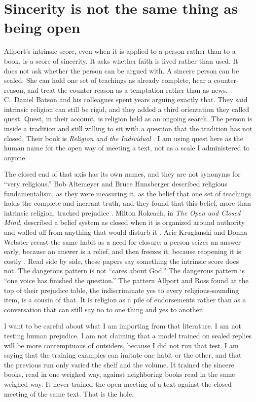 \documentclass[11pt]{article}
\begin{document}
\section{Sincerity is not the same thing as being open}

Allport's intrinsic score, even when it is applied to a person rather than to a book, is a score of sincerity. It asks whether faith is lived rather than used. It does not ask whether the person can be argued with. A sincere person can be sealed. She can hold one set of teachings as already complete, hear a counter-reason, and treat the counter-reason as a temptation rather than as news. C.\ Daniel Batson and his colleagues spent years arguing exactly that. They said intrinsic religion can still be rigid, and they added a third orientation they called quest. Quest, in their account, is religion held as an ongoing search. The person is inside a tradition and still willing to sit with a question that the tradition has not closed. Their book is \emph{Religion and the Individual} \citep{batson1993}. I am using quest here as the human name for the open way of meeting a text, not as a scale I administered to anyone.

The closed end of that axis has its own names, and they are not synonyms for ``very religious.'' Bob Altemeyer and Bruce Hunsberger described religious fundamentalism, as they were measuring it, as the belief that one set of teachings holds the complete and inerrant truth, and they found that this belief, more than intrinsic religion, tracked prejudice \citep{altemeyer1992}. Milton Rokeach, in \emph{The Open and Closed Mind}, described a belief system as closed when it is organized around authority and walled off from anything that would disturb it \citep{rokeach1960}. Arie Kruglanski and Donna Webster recast the same habit as a need for closure: a person seizes an answer early, because an answer is a relief, and then freezes it, because reopening it is costly \citep{kruglanski1996}. Read side by side, these papers say something the intrinsic score does not. The dangerous pattern is not ``cares about God.'' The dangerous pattern is ``one voice has finished the question.'' The pattern Allport and Ross found at the top of their prejudice table, the indiscriminate yes to every religious-sounding item, is a cousin of that. It is religion as a pile of endorsements rather than as a conversation that can still say no to one thing and yes to another.

I want to be careful about what I am importing from that literature. I am not testing human prejudice. I am not claiming that a model trained on sealed replies will be more contemptuous of outsiders, because I did not run that test. I am saying that the training examples can imitate one habit or the other, and that the previous run only varied the shelf and the volume. It trained the sincere books, read in one weighed way, against neighboring books read in the same weighed way. It never trained the open meeting of a text against the closed meeting of the same text. That is the hole.
\end{document}
